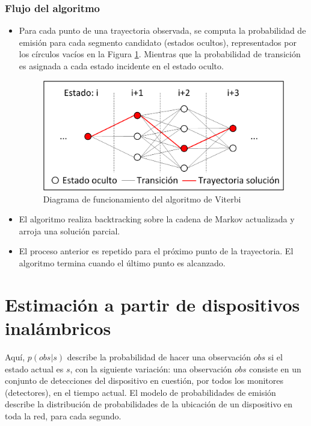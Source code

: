\subsubsection{Flujo del algoritmo}
\begin{itemize}
\item Para cada punto de una trayectoria observada, se computa la probabilidad de emisión para cada segmento candidato (estados ocultos), representados por los círculos vacíos en la Figura \ref{fig:algviterbi}. Mientras que la probabilidad de transición es asignada a cada estado incidente en el estado oculto.\par
\begin{figure}[ht]
	\centering
	\includegraphics[scale=0.7]{images/viterbi.png}
    \caption{Diagrama de funcionamiento del algoritmo de Viterbi}
    \label{fig:algviterbi}
\end{figure}
\item El algoritmo realiza backtracking sobre la cadena de Markov actualizada y arroja una solución parcial.
\item El proceso anterior es repetido para el próximo punto de la trayectoria. El algoritmo termina cuando el último punto es alcanzado.
\end{itemize}


\section{Estimación a partir de dispositivos inalámbricos}\label{sec:estimacionwireless}

Aquí, $p(obs|s)$ describe la probabilidad de hacer una observación $obs$ si el estado actual es $s$, con la siguiente variación: una observación $obs$ consiste en un conjunto de detecciones del dispositivo en cuestión, por todos los monitores (detectores), en el tiempo actual. El modelo de probabilidades de emisión describe la distribución de probabilidades de la ubicación de un dispositivo en toda la red, para cada segundo.


